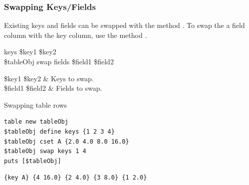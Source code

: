 \subsubsection{Swapping Keys/Fields}
Existing keys and fields can be swapped with the method .
To swap the a field column with the key column, use the method .

\begin{syntax}
 keys \$key1 \$key2 \\
\$tableObj swap fields \$field1 \$field2
\end{syntax}
\begin{args}
\$key1 \$key2 & Keys to swap. \\
\$field1 \$field2 & Fields to swap.
\end{args}

\begin{example}{Swapping table rows}
\begin{lstlisting}
table new tableObj
$tableObj define keys {1 2 3 4}
$tableObj cset A {2.0 4.0 8.0 16.0}
$tableObj swap keys 1 4
puts [$tableObj]
\end{lstlisting}
\tcblower
\begin{lstlisting}
{key A} {4 16.0} {2 4.0} {3 8.0} {1 2.0}
\end{lstlisting}
\end{example}

\clearpage



